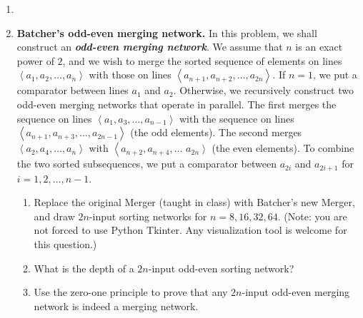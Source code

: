 \documentclass[12pt,a4paper]{article}
\makeatletter
\newtheorem*{solution}{Solution}
\theoremstyle{definition}
\renewenvironment{solution}[1][Solution] {\par\pushQED{\qed}\normalfont\topsep6\p@\@plus6\p@\relax\trivlist\item[\hskip\labelsep\bfseries#1\@addpunct{.}]\ignorespaces}{\popQED\endtrivlist\@endpefalse} \makeatother
\makeatother
\begin{document}
\begin{enumerate}
\begin{solution}
	\end{solution}
    \item
    \textbf{Batcher's odd-even merging network.} In this problem, we shall construct an \textbf{\textit{odd-even merging network}}. We assume that $n$ is an exact power of $2$, and we wish to merge the sorted sequence of elements on lines $\left\langle a_{1}, a_{2}, \ldots, a_{n}\right\rangle$ with those on lines $\left\langle a_{n+1}, a_{n+2}, \ldots, a_{2n}\right\rangle .$ If $n=1$, we put a comparator between lines $a_{1}$ and $a_{2}$. Otherwise, we recursively construct two odd-even merging networks that operate in parallel. The first merges the sequence on lines $\left\langle a_{1}, a_{3}, \ldots, a_{n-1}\right\rangle$ with the sequence on lines $\left\langle a_{n+1}, a_{n+3}, \ldots, a_{2n-1}\right\rangle$ (the
    odd elements). The second merges $\left\langle a_{2}, a_{4}, \ldots, a_{n}\right\rangle$ with $\left\langle a_{n+2}, a_{n+4}, \ldots\right.$
    $\left.a_{2n}\right\rangle$ (the even elements). To combine the two sorted subsequences, we put a comparator between $a_{2i}$ and $a_{2i+1}$ for $i=1,2, \ldots, n-1$.
    \begin{enumerate}
    	\item Replace the original Merger (taught in class) with Batcher's new Merger, and draw $2n$-input sorting networks for $n=8, 16, 32, 64$. {\color{blue}(Note: you are not forced to use Python Tkinter. Any visualization tool is welcome for this question.)}
    	
    	\item What is the depth of a $2n$-input odd-even sorting network?
    	
    	\item
    	{\color{red}{(Optional Sub-question with Bonus)}} Use the zero-one principle to prove that any $2n$-input odd-even merging network is indeed a merging network.
    	

\end{enumerate}
\end{enumerate}
\end{document}
